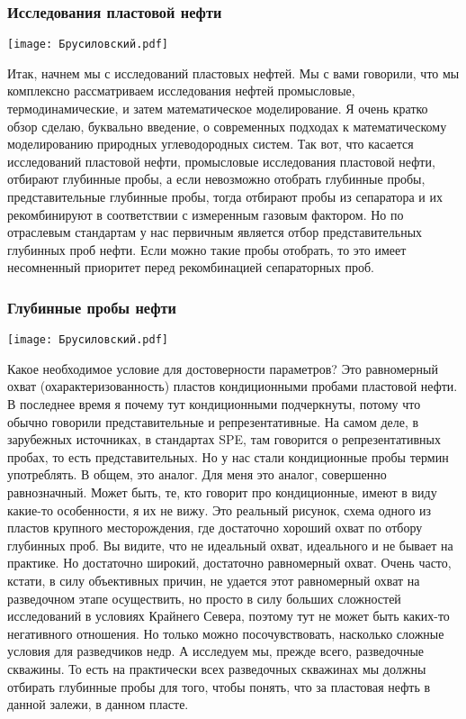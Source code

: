 \documentclass[main.tex]{subfiles}
\begin{document}
\subsubsection{Исследования пластовой нефти}

\begin{center}
\texttt{[image: Брусиловский.pdf]}
\end{center}

Итак, начнем мы с исследований пластовых нефтей.
Мы с вами говорили, что мы комплексно рассматриваем исследования нефтей промысловые, термодинамические, и затем математическое моделирование.
Я очень кратко обзор сделаю, буквально введение, о современных подходах к математическому моделированию природных углеводородных систем.
Так вот, что касается исследований пластовой нефти, промысловые исследования пластовой нефти, отбирают глубинные пробы, а если невозможно отобрать глубинные пробы, представительные глубинные пробы, тогда отбирают пробы из сепаратора и их рекомбинируют в соответствии с измеренным газовым фактором.
Но по отраслевым стандартам у нас первичным является отбор представительных глубинных проб нефти.
Если можно такие пробы отобрать, то это имеет несомненный приоритет перед рекомбинацией сепараторных проб.

\subsubsection{Глубинные пробы нефти}

\begin{center}
\texttt{[image: Брусиловский.pdf]}
\end{center}

Какое необходимое условие для достоверности параметров?
Это равномерный охват (охарактеризованность) пластов кондиционными пробами пластовой нефти.
В последнее время я почему тут кондиционными подчеркнуты, потому что обычно говорили представительные и репрезентативные.
На самом деле, в зарубежных источниках, в стандартах SPE, там говорится о репрезентативных пробах, то есть представительных.
Но у нас стали кондиционные пробы термин употреблять.
В общем, это аналог.
Для меня это аналог, совершенно равнозначный.
Может быть, те, кто говорит про кондиционные, имеют в виду какие-то особенности, я их не вижу.
Это реальный рисунок, схема одного из пластов крупного месторождения, где достаточно хороший охват по отбору глубинных проб.
Вы видите, что не идеальный охват, идеального и не бывает на практике.
Но достаточно широкий, достаточно равномерный охват.
Очень часто, кстати, в силу объективных причин, не удается этот равномерный охват на разведочном этапе осуществить, но просто в силу больших сложностей исследований в условиях Крайнего Севера, поэтому тут не может быть каких-то негативного отношения.
Но только можно посочувствовать, насколько сложные условия для разведчиков недр.
А исследуем мы, прежде всего, разведочные скважины.
То есть на практически всех разведочных скважинах мы должны отбирать глубинные пробы для того, чтобы понять, что за пластовая нефть в данной залежи, в данном пласте.
\end{document}
